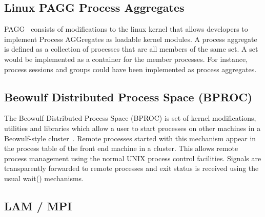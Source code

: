 \subsection*{Linux PAGG Process Aggregates}

PAGG~\cite{PAGG}
consists of modifications to the linux kernel that allows
developers to implement Process AGGregates as loadable kernel modules.
A process aggregate is defined as a collection of processes that are
all members of the same set. A set would be implemented as a container
for the member processes. For instance, process sessions and groups
could have been implemented as process aggregates.


\subsection*{Beowulf Distributed Process Space (BPROC)}

The Beowulf Distributed Process Space 
(BPROC)
is set of kernel
modifications, utilities and libraries which allow a user to start
processes on other machines in a Beowulf-style cluster~\cite{BProc}.  Remote
processes started with this mechanism appear in the process table
of the front end machine in a cluster. This allows remote process
management using the normal UNIX process control facilities. Signals
are transparently forwarded to remote processes and exit status is
received using the usual wait() mechanisms.

%
%
%
%
%
%
\subsection*{LAM / MPI}

